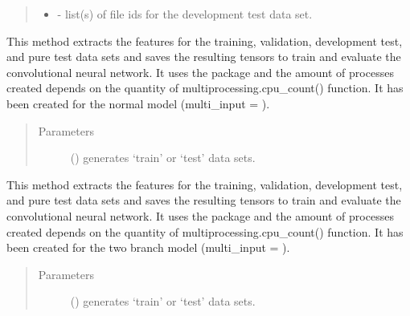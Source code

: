 \documentclass[letterpaper,10pt,english]{sphinxmanual}
\begin{document}
\begin{fulllineitems}
\begin{fulllineitems}
\begin{quote}
\begin{description}
\begin{itemize}
\item {} 
  - list(s) of file ids for the development test data set.

\end{itemize}


\end{description}\end{quote}

\end{fulllineitems}


\begin{fulllineitems}
\label{\detokenize{generate_dataset:generate_dataset.GenerateDataset.run}}
This method extracts the features for the training, validation,
development test, and pure test data sets and saves the resulting tensors
to train and evaluate the convolutional neural network. It uses the 
 package and the amount of processes created depends on the
quantity of multiprocessing.cpu\_count() function. It has been created for the
normal model (multi\_input = ).
\begin{quote}\begin{description}
\item[{Parameters}] \leavevmode
{} () \textendash{} generates ‘train’ or ‘test’ data sets.

\end{description}\end{quote}

\end{fulllineitems}


\begin{fulllineitems}
\label{\detokenize{generate_dataset:generate_dataset.GenerateDataset.run_multi}}
This method extracts the features for the training, validation,
development test, and pure test data sets and saves the resulting tensors
to train and evaluate the convolutional neural network. It uses the 
 package and the amount of processes created depends on the
quantity of multiprocessing.cpu\_count() function. It has been created for the
two branch model (multi\_input = ).
\begin{quote}\begin{description}
\item[{Parameters}] \leavevmode
{} () \textendash{} generates ‘train’ or ‘test’ data sets.


\end{description}
\end{quote}
\end{fulllineitems}
\end{fulllineitems}
\end{document}
